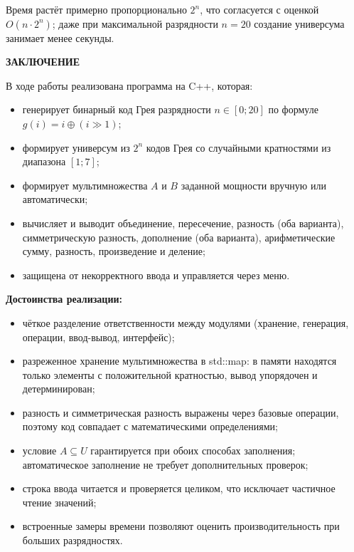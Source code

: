 \documentclass[14pt,a4paper]{extarticle}
\newcommand{\structhead}[2]{%
  \clearpage\phantomsection
  \begin{center}\normalfont\bfseries\fontsize{14}{16}\selectfont #1\end{center}\vspace{6pt}
  \addcontentsline{toc}{section}{#2}}
\newcommand{\code}[1]{{\monofont #1}}
\newcommand{\xor}{\mathbin{\oplus}}
\newcommand{\shr}{\mathbin{\gg}}
\begin{document}
Время растёт примерно пропорционально $2^n$, что согласуется с оценкой $O(n\cdot 2^n)$; даже при максимальной разрядности $n=20$ создание универсума занимает менее секунды.

\structhead{ЗАКЛЮЧЕНИЕ}{Заключение}

В ходе работы реализована программа на C++, которая:
\begin{itemize}
\item генерирует бинарный код Грея разрядности $n\in[0;20]$ по формуле $g(i)=i\xor(i\shr 1)$;
\item формирует универсум из $2^n$ кодов Грея со случайными кратностями из диапазона $[1;7]$;
\item формирует мультимножества $A$ и $B$ заданной мощности вручную или автоматически;
\item вычисляет и выводит объединение, пересечение, разность (оба варианта), симметрическую разность, дополнение (оба варианта), арифметические сумму, разность, произведение и деление;
\item защищена от некорректного ввода и управляется через меню.
\end{itemize}

\textbf{Достоинства реализации:}
\begin{itemize}
\item чёткое разделение ответственности между модулями (хранение, генерация, операции, ввод-вывод, интерфейс);
\item разреженное хранение мультимножества в \code{std::map}: в памяти находятся только элементы с положительной кратностью, вывод упорядочен и детерминирован;
\item разность и симметрическая разность выражены через базовые операции, поэтому код совпадает с математическими определениями;
\item условие $A\subseteq U$ гарантируется при обоих способах заполнения; автоматическое заполнение не требует дополнительных проверок;
\item строка ввода читается и проверяется целиком, что исключает частичное чтение значений;
\item встроенные замеры времени позволяют оценить производительность при больших разрядностях.
\end{itemize}
\end{document}
